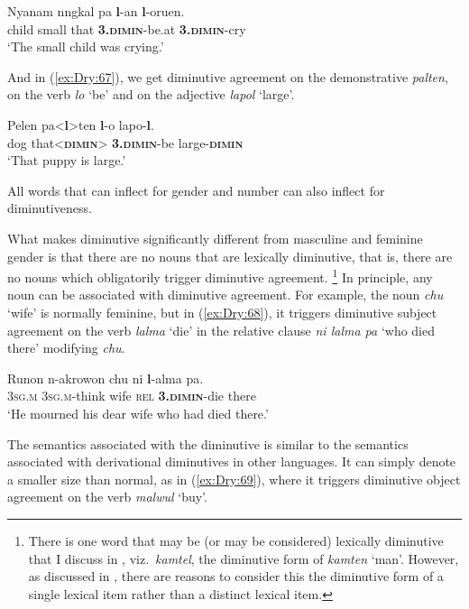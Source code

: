 \documentclass[output=collectionpaper]{langsci/langscibook}
\begin{document}
\ea \label{ex:Dry:66}
\gll Nyanam	nngkal	pa	\textbf{l}-an	\textbf{l}-oruen.\\
child small that \textbf{\textsc{3.dimin}}-be.at \textbf{\textsc{3.dimin}}-cry\\
\glt `The small child was crying.'
\z

And in (\ref{ex:Dry:67}), we get diminutive agreement on the demonstrative \textit{palten}, on the verb \textit{lo} `be' and on the adjective \textit{lapol} `large'.

\ea \label{ex:Dry:67}
\gll Pelen	pa<\textbf{l}>ten	\textbf{l}-o	lapo-\textbf{l}.\\
dog that<\textbf{\textsc{dimin}}> \textbf{\textsc{3.dimin}}-be large-\textbf{\textsc{dimin}}\\
\glt `That puppy is large.'
\z

All words that can inflect for gender and number can also inflect for diminutiveness.

What makes diminutive significantly different from masculine and feminine gender is that there are no nouns that are lexically diminutive, that is, there are no nouns which obligatorily trigger diminutive agreement.%
\footnote{There is one word that may be (or may be considered) lexically diminutive that I discuss in \citet{DryerUnderrevision}, viz.\ \textit{kamtel}, the diminutive form of \textit{kamten} `man'. However, as discussed in \citep{DryerUnderrevision}, there are reasons to consider this the diminutive form of a single lexical item rather than a distinct lexical item.} %
In principle, any noun can be associated with diminutive agreement. For example, the noun \textit{chu} `wife' is normally feminine, but in (\ref{ex:Dry:68}), it triggers diminutive subject agreement on the verb \textit{lalma} `die' in the relative clause \textit{ni lalma pa} `who died there' modifying \textit{chu}.

\ea \label{ex:Dry:68}
\gll Runon	n-akrowon	chu	ni	\textbf{l}-alma	pa.\\
\textsc{3sg.m} \textsc{3sg.m}-think wife \textsc{rel} \textbf{\textsc{3.dimin}}-die there\\
\glt `He mourned his dear wife who had died there.'
\z

The semantics associated with the  diminutive is similar to the semantics associated with derivational diminutives in other languages. It can simply denote a smaller size than normal, as in (\ref{ex:Dry:69}), where it triggers diminutive object agreement on the verb \textit{malwul} `buy'.
\end{document}
